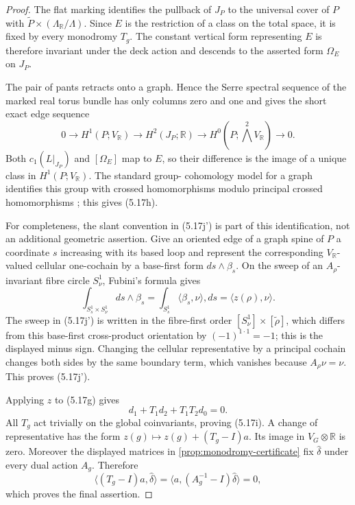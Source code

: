 \begin{proof}
The flat marking identifies the pullback of $J_P$ to the universal cover of
$P$ with
$\widetilde P\times(\Lambda_{\mathbb R}/\Lambda)$.  Since $E$ is the
restriction of a class on the total space, it is fixed by every monodromy
$T_g$.  The constant vertical form representing $E$ is therefore invariant
under the deck action and descends to the asserted form $\Omega_E$ on
$J_P$.

The pair of pants retracts onto a graph.  Hence the Serre spectral sequence
of the marked real torus bundle has only columns zero and one and gives the
short exact edge sequence
\[
0\longrightarrow H^1(P;V_{\mathbb R})
 \longrightarrow H^2(J_P;\mathbb R)
 \longrightarrow H^0(P;\textstyle\bigwedge^2V_{\mathbb R})
 \longrightarrow0.
\tag{5.17j}
\]
Both $c_1(L|_{J_P})$ and $[\Omega_E]$ map to $E$, so their difference is
the image of a unique class in $H^1(P;V_{\mathbb R})$.  The standard group-
cohomology model for a graph identifies this group with crossed
homomorphisms modulo principal crossed homomorphisms
\cite[Chapter~I, \S5]{Brown1982}; this gives (5.17h).

For completeness, the slant convention in (5.17j') is part of this
identification, not an additional geometric assertion.  Give an oriented
edge of a graph spine of $P$ a coordinate $s$ increasing with its based
loop and represent the corresponding $V_{\mathbb R}$-valued cellular
one-cochain by a base-first form $ds\wedge\beta_s$.  On the sweep of an
$A_\rho$-invariant fibre circle $S^1_\nu$, Fubini's formula gives
\[
\int_{S^1_s\times S^1_\nu}ds\wedge\beta_s
 =\int_{S^1_s}\langle\beta_s,\nu\rangle,ds
 =\langle z(\rho),\nu\rangle.
\]
The sweep in (5.17j') is written in the fibre-first order
$[S^1_\nu]\times[\widetilde\rho]$, which differs from this base-first
cross-product orientation by $(-1)^{1\cdot1}=-1$; this is the displayed
minus sign.
Changing the cellular representative by a principal cochain changes both
sides by the same boundary term, which vanishes because $A_\rho\nu=\nu$.
This proves (5.17j').

Applying $z$ to (5.17g) gives
\[
 d_1+T_1d_2+T_1T_2d_0=0.
\]
All $T_g$ act trivially on the global coinvariants, proving (5.17i).  A
change of representative has the form
$z(g)\mapsto z(g)+(T_g-I)a$.  Its image in $V_G\otimes\mathbb R$ is zero.
Moreover the displayed matrices in
\cref{prop:monodromy-certificate} fix $\widehat\delta$ under every dual
action $A_g$.  Therefore
\[
 \langle(T_g-I)a,\widehat\delta\rangle
 =\langle a,(A_g^{-1}-I)\widehat\delta\rangle=0,
\]
which proves the final assertion.
\end{proof}

